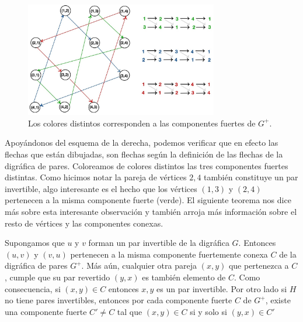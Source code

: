 \begin{figure}[H]
  \centering
  \includegraphics[width=0.75\textwidth]{recursos/capturas/PairDgrph.jpg}
  \caption{Los colores distintos corresponden a las componentes fuertes de $G^+$.}
  \label{fig:InvrtblPair02}
\end{figure}

Apoyándonos del esquema de la derecha, podemos verificar que en efecto las flechas que están dibujadas, son flechas según la definición de las flechas de la digráfica de pares. Coloreamos de colores distintos las tres componentes fuertes distintas. Como hicimos notar la pareja de vértices $2,4$ también constituye un par invertible, algo interesante es el hecho que los vértices $(1,3)$ y  $(2,4)$ pertenecen a la misma componente fuerte (verde). El siguiente teorema nos dice más sobre esta interesante observación y también arroja más información sobre el resto de vértices y las componentes conexas.

\begin{teorema}
\label{teo:PairDigrph}
    Supongamos que $u$ y $v$ forman un par invertible de la digráfica $G$. Entonces $(u,v)$ y $(v,u)$ pertenecen a la misma componente fuertemente conexa $C$ de la digráfica de pares $G^+$. Más aún, cualquier otra pareja $(x,y)$ que pertenezca a $C$, cumple que su par revertido $(y,x)$ es también elemento de $C$.  Como consecuencia, si $(x,y) \in C$ entonces $x,y$ es un par invertible. Por otro lado si $H$ no tiene pares invertibles, entonces por cada componente fuerte $C$ de $G^+$, existe una componente fuerte $C' \neq C$ tal que $(x,y)\in C $ si y solo si $(y,x)\in C'$
\end{teorema}


